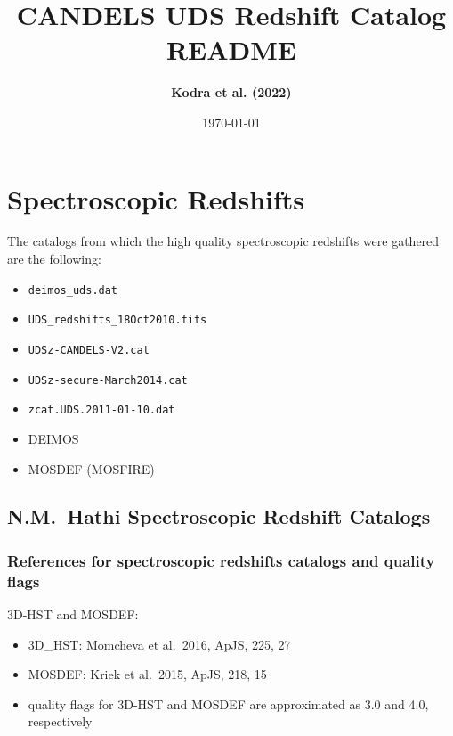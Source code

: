 \documentclass[12pt,onecolumn]{article}
\title{\textbf{CANDELS UDS Redshift Catalog README}}
\author{\textbf{Kodra et al. (2022)}}
\date{\today}
\begin{document}
\maketitle





\section*{Spectroscopic Redshifts}

The catalogs from which the high quality spectroscopic redshifts were gathered are the following:
\begin{itemize}
\item \texttt{deimos\_uds.dat}
\item \texttt{UDS\_redshifts\_18Oct2010.fits}
\item \texttt{UDSz-CANDELS-V2.cat}
\item \texttt{UDSz-secure-March2014.cat}
\item \texttt{zcat.UDS.2011-01-10.dat}
\item DEIMOS
\item MOSDEF (MOSFIRE)
\end{itemize}

\subsection*{N.M.~Hathi Spectroscopic Redshift Catalogs}
\subsubsection*{References for spectroscopic redshifts catalogs and quality flags}

\noindent 3D-HST and MOSDEF:
\begin{itemize}
\item 3D\_HST: Momcheva et al.\ 2016, ApJS, 225, 27
\item MOSDEF: Kriek et al.\ 2015, ApJS, 218, 15
\item quality flags for 3D-HST and MOSDEF are approximated as 3.0 and 4.0, respectively
\end{itemize}
\end{document}
